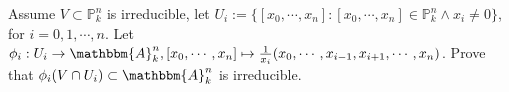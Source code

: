 \documentclass{ctexart}
\newif\ifpreface
\begin{document}
\large
\setlength{\baselineskip}{1.2em}
\ifpreface
    
\newgeometry{left=2cm,right=2cm,top=2cm,bottom=2cm}
\else
{}
\maketitle
\fi
\begin{problem}
  Assume \(V \subset \mathbb{P}_k^{n}\) is irreducible, let \(U_i:=\{[x_0,\cdots,x_n]:[x_0,\cdots,x_n] \in \mathbb{P}_k^n \wedge x_i \neq 0\}\), for \(i=0,1,\cdots,n\). 
  Let \(\phi_i:U_i \to \mathbbm{A}_k^n,[x_0,\cdots,x_n] \mapsto \frac{1}{x_i}(x_0,\cdots,x_{i-1},x_{i+1},\cdots,x_n)\). 
  Prove that \(\phi_i(V \cap U_i) \subset \mathbbm{A}_k^n\) is irreducible. 
\end{problem}
\end{document}
